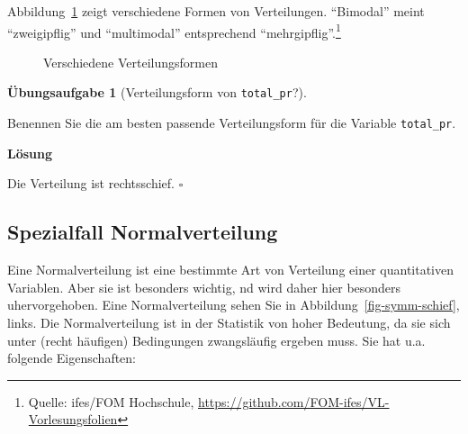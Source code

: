 \documentclass[
  letterpaper,
  twoside,
  open=any]{scrbook}
\theoremstyle{definition}
\theoremstyle{definition}
\newtheorem{exercise}{Übungsaufgabe}[chapter]
\theoremstyle{definition}
\theoremstyle{remark}
\begin{document}
Abbildung~\ref{fig-plot-distribs} zeigt verschiedene Formen von
Verteilungen. \enquote{Bimodal} meint \enquote{zweigipflig} und
\enquote{multimodal} entsprechend \enquote{mehrgipflig}.\footnote{Quelle:
  ifes/FOM Hochschule,
  \url{https://github.com/FOM-ifes/VL-Vorlesungsfolien}}

\begin{figure}


\caption{\label{fig-plot-distribs}Verschiedene Verteilungsformen}

\end{figure}%

\begin{exercise}[Verteilungsform von
\texttt{total\_pr}?]\protect\hypertarget{exr-verteilungsform-total-pr}{}\label{exr-verteilungsform-total-pr}

Benennen Sie die am besten passende Verteilungsform für die Variable
\texttt{total\_pr}.

\textbf{Lösung}

Die Verteilung ist rechtsschief. \(\square\)

\end{exercise}

\subsection{Spezialfall
Normalverteilung}\label{spezialfall-normalverteilung}

Eine Normalverteilung ist eine bestimmte Art von Verteilung einer
quantitativen Variablen. Aber sie ist besonders wichtig, nd wird daher
hier besonders uhervorgehoben. Eine Normalverteilung sehen Sie in
Abbildung~\ref{fig-symm-schief}, links. Die Normalverteilung ist in der
Statistik von hoher Bedeutung, da sie sich unter (recht häufigen)
Bedingungen zwangsläufig ergeben muss. Sie hat u.a. folgende
Eigenschaften:
\end{document}
